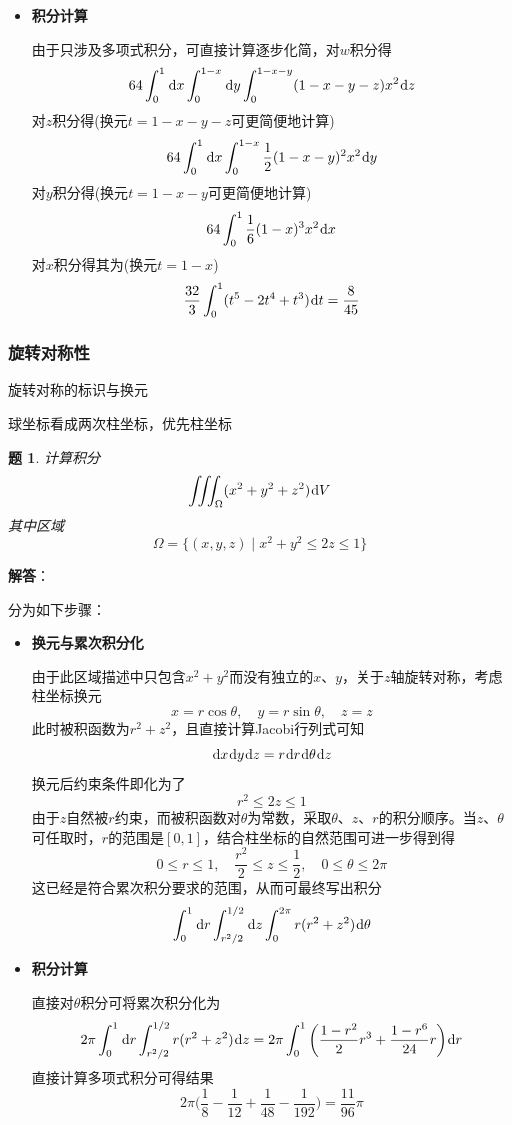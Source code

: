 \documentclass[a4paper,UTF8,fontset=windows,AutoFakeBold]{ctexart}
\newcommand*{\dr}{\hspace{0.07em}\mathrm{d}}
\theoremstyle{ex}
\newtheorem{exercise}{题}
\newcommand{\sol}[1]{{\vspace{5pt}\kaishu\noindent\textbf{解答}：\vspace{-3pt}
\begin{compactitem}
    \item[] #1
\end{compactitem}
}}
\begin{document}
\begin{framed}
{\begin{itemize}
        \item \textbf{积分计算}
        
        由于只涉及多项式积分，可直接计算逐步化简，对$w$积分得
        $$64\int_0^1\dr x\int_0^{1-x}\dr y\int_0^{1-x-y}(1-x-y-z)x^2\dr z$$
        对$z$积分得(换元$t=1-x-y-z$可更简便地计算)
        $$64\int_0^1\dr x\int_0^{1-x}\frac{1}{2}(1-x-y)^2x^2\dr y$$
        对$y$积分得(换元$t=1-x-y$可更简便地计算)
        $$64\int_0^1\frac{1}{6}(1-x)^3x^2\dr x$$
        对$x$积分得其为(换元$t=1-x$)
        $$\frac{32}{3}\int_0^1(t^5-2t^4+t^3)\dr t=\frac{8}{45}$$
    \end{itemize}
}
\end{framed}

\subsubsection{旋转对称性}
旋转对称的标识与换元

球坐标看成两次柱坐标，优先柱坐标

\begin{framed}
\begin{exercise}
    计算积分
    $$\iiint_\Omega(x^2+y^2+z^2)\dr V$$
    其中区域
    $$\Omega=\{(x,y,z)\mid x^2+y^2\le 2z\le1\}$$
\end{exercise}
\sol{
    分为如下步骤：
    \begin{itemize}
        \item \textbf{换元与累次积分化}
        
        由于此区域描述中只包含$x^2+y^2$而没有独立的$x$、$y$，关于$z$轴旋转对称，考虑柱坐标换元
        $$x=r\cos\theta,\quad y=r\sin\theta,\quad z=z$$
        此时被积函数为$r^2+z^2$，且直接计算Jacobi行列式可知
        $$\dr x\dr y\dr z=r\dr r\dr\theta\dr z$$
        换元后约束条件即化为了
        $$r^2\le 2z\le1$$
        由于$z$自然被$r$约束，而被积函数对$\theta$为常数，采取$\theta$、$z$、$r$的积分顺序。当$z$、$\theta$可任取时，$r$的范围是$[0,1]$，结合柱坐标的自然范围可进一步得到得
        $$0\le r\le1,\quad\frac{r^2}{2}\le z\le\frac{1}{2},\quad 0\le\theta\le 2\pi$$
        这已经是符合累次积分要求的范围，从而可最终写出积分
        $$\int_0^1\dr r\int_{r^2/2}^{1/2}\dr z\int_0^{2\pi}r(r^2+z^2)\dr\theta$$

        \item \textbf{积分计算}
        
        直接对$\theta$积分可将累次积分化为
        $$2\pi\int_0^1\dr r\int_{r^2/2}^{1/2}r(r^2+z^2)\dr z=2\pi\int_0^1\bigg(\frac{1-r^2}{2}r^3+\frac{1-r^6}{24}r\bigg)\dr r$$
        直接计算多项式积分可得结果
        $$2\pi\bigg(\frac{1}{8}-\frac{1}{12}+\frac{1}{48}-\frac{1}{192}\bigg)=\frac{11}{96}\pi$$
    \end{itemize}
}
\end{framed}
\end{document}
